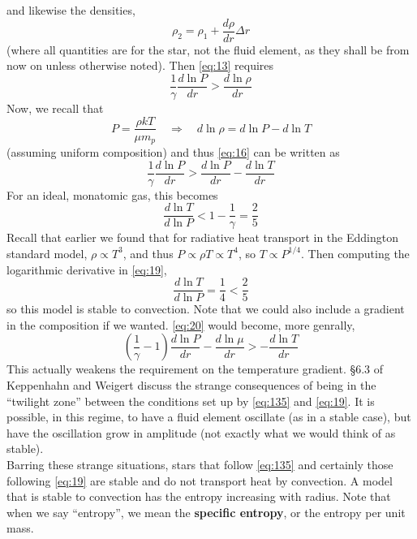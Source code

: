 \documentclass[10pt]{article}
\numberwithin{equation}{section}
\newcommand{\n}{\noindent}
\begin{document}
and likewise the densities, 
\begin{equation}
  \label{eq:15}
  \rho_2=\rho_1+\frac{d\rho}{dr}\Delta r
\end{equation}
(where all quantities are for the star, not the fluid element, as they
shall be from now on unless otherwise noted). Then \eqref{eq:13} requires
\begin{equation}
  \label{eq:16}
  \frac{1}{\gamma}\frac{d\ln P}{dr}>\frac{d\ln\rho}{dr}
\end{equation}
Now, we recall that
\begin{equation}
  \label{eq:17}
  P=\frac{\rho kT}{\mu m_p} \quad\Rightarrow \quad d\ln\rho=d\ln
  P-d\ln T
\end{equation}
(assuming uniform composition) and thus \eqref{eq:16} can be written as
\begin{equation}
  \label{eq:18}
  \frac{1}{\gamma}\frac{d\ln P}{dr}>\frac{d\ln P}{dr}-\frac{d\ln T}{dr}
\end{equation}
For an ideal, monatomic gas, this becomes
\begin{equation}
  \label{eq:19}
  \frac{d\ln T}{d\ln P}<1-\frac{1}{\gamma}=\frac{2}{5}
\end{equation}
Recall that earlier we found that for radiative heat transport in the
Eddington standard model,
$\rho\propto T^3$, and thus $P\propto \rho T\propto T^4$, so
$T\propto P^{1/4}$. Then computing the logarithmic derivative in
\eqref{eq:19}, 
\begin{equation}
  \label{eq:20}
  \frac{d\ln T}{d\ln P}=\frac{1}{4}<\frac{2}{5}
\end{equation}
so this model is stable to convection. Note that we could also include a
gradient in the composition if we wanted. \eqref{eq:20} would become, more
genrally,
\begin{equation}
  \label{eq:135}
  \boxed{\left(\frac{1}{\gamma}-1\right)\frac{d\ln
    P}{dr}-\frac{d\ln\mu}{dr}>-\frac{d\ln T}{dr}}
\end{equation}
This actually weakens the requirement on the temperature
gradient. \S6.3 of Keppenhahn and Weigert discuss the strange
consequences of being in the ``twilight zone'' between the conditions
set up by \eqref{eq:135} and \eqref{eq:19}. It is possible, in this
regime, to have a fluid element oscillate (as in a stable case), but
have the oscillation grow in amplitude (not exactly what we would
think of as stable).\\

\n Barring these strange situations, stars that follow \eqref{eq:135}
and certainly those following \eqref{eq:19} are stable and do not transport 
heat by
convection. A model that is stable to convection has the entropy
increasing with radius. Note that when we say ``entropy'', we mean the
\textbf{specific entropy}, or the entropy per unit mass.\\
\end{document}
